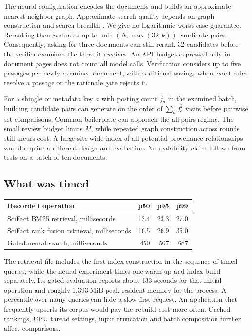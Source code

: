 The neural configuration encodes the documents and builds an approximate nearest-neighbor graph. Approximate search quality depends on graph construction and search breadth \cite{HNSW}. We give no logarithmic worst-case guarantee. Reranking then evaluates up to $\min(N,\max(32,k))$ candidate pairs. Consequently, asking for three documents can still rerank 32 candidates before the verifier examines the three it receives. An API budget expressed only in document pages does not count all model calls. Verification considers up to five passages per newly examined document, with additional savings when exact rules resolve a passage or the rationale gate rejects it.

For a shingle or metadata key $a$ with posting count $f_a$ in the examined batch, building candidate pairs can generate on the order of $\sum_a f_a^2$ visits before pairwise set comparisons. Common boilerplate can approach the all-pairs regime. The small review budget limits $M$, while repeated graph construction across rounds still incurs cost. A large site-wide index of all potential provenance relationships would require a different design and evaluation. No scalability claim follows from tests on a batch of ten documents.

\subsection{What was timed}
\begin{center}\small
\begin{tabularx}{\linewidth}{@{}Xrrr@{}}\toprule
Recorded operation & p50 & p95 & p99\\\midrule
SciFact BM25 retrieval, milliseconds & 13.4 & 23.3 & 27.0\\
SciFact rank fusion retrieval, milliseconds & 16.5 & 26.9 & 35.0\\
Gated neural search, milliseconds & 450 & 567 & 687\\\bottomrule
\end{tabularx}
\end{center}
The retrieval file includes the first index construction in the sequence of timed queries, while the neural experiment times one warm-up and index build separately. Its gated evaluation reports about 133 seconds for that initial operation and roughly 1,393 MiB peak resident memory for the process. A percentile over many queries can hide a slow first request. An application that frequently upserts its corpus would pay the rebuild cost more often. Cached rankings, CPU thread settings, input truncation and batch composition further affect comparisons.

